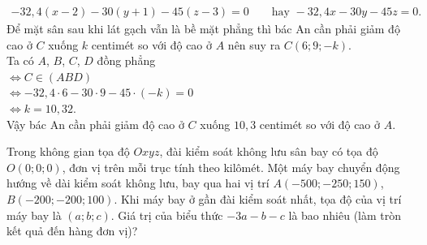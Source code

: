 \begin{bt}
{\begin{eqnarray*}
			-32{,}4 (x-2)-30(y+1)-45(z-3)=0 \qquad \text{hay } -32{,}4 x -30y -45z=0.
		\end{eqnarray*}
		Để mặt sân sau khi lát gạch vẫn là bề mặt phẳng thì bác An cần phải giảm độ cao ở $C$ xuống $k$ centimét so với độ cao ở $A$ nên suy ra $C(6; 9 ; -k)$.\\
		Ta có $A$, $B$, $C$, $D$ đồng phẳng\\
		$\Leftrightarrow C \in (ABD)$\\
		$\Leftrightarrow -32{,}4\cdot 6 -30 \cdot 9 -45\cdot (-k)=0$\\
		$\Leftrightarrow k=10{,}32$.\\
		Vậy bác An cần phải giảm độ cao ở $C$ xuống $10{,}3$ centimét so với độ cao ở $A$.
}\end{bt}

\begin{bt}%

	Trong không gian tọa độ $O x y z$, đài kiểm soát không lưu sân bay có tọa độ $O (0; 0; 0)$, đơn vị trên mỗi trục tính theo kilômét. Một máy bay chuyển động hướng về dài kiểm soát không lưu, bay qua hai vị trí $A \left(-500; -250; 150\right)$, $B \left(-200; -200; 100\right)$. Khi máy bay ở gần đài kiểm soát nhất, tọa độ của vị trí máy bay là $\left(a; b; c\right)$. Giá trị của biểu thức $-3a - b -c$ là bao nhiêu (làm tròn kết quả đến hàng đơn vị)? 
\end{bt}

